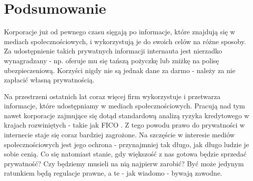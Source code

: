 \documentclass[polish]{kbk}
\begin{document}
\section{Podsumowanie}
Korporacje już od pewnego czasu sięgają po informacje, które znajdują się w mediach społecznościowych, i wykorzystują je do swoich celów na różne sposoby. Za udostępnienie takich prywatnych informacji internauta jest nierzadko wynagradzany - np. oferuje mu się tańszą pożyczkę lub zniżkę na polisę ubezpieczeniową. Korzyści nigdy nie są jednak dane za darmo - należy za nie zapłacić własną prywatnością. 

Na przestrzeni ostatnich lat coraz więcej firm wykorzystuje i przetwarza informacje, które udostępniamy w mediach społecznościowych. Pracują nad tym nawet korporacje zajmujące się dotąd standardową analizą ryzyka kredytowego w krajach rozwiniętych - takie jak FICO \cite{fico}. Z tego powodu prawo do prywatności w internecie staje się coraz bardziej zagrożone. Na szczęście w interesie mediów społecznościowych jest jego ochrona - przynajmniej tak długo, jak długo ludzie je sobie cenią. Co się natomiast stanie, gdy większość z nas gotowa będzie sprzedać prywatność? Czy będziemy musieli na nią najpierw zarobić? Być może jedynym ratunkiem będą regulacje prawne, a te - jak wiadomo - bywają zawodne.
\end{document}
